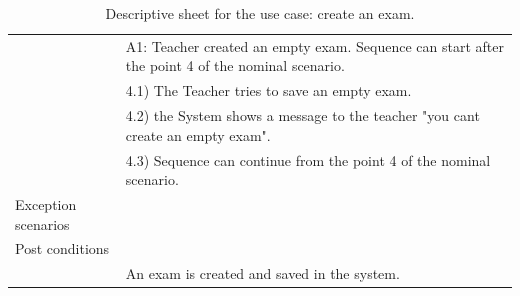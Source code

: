 \documentclass[]{uc2pfecaneva}
\begin{document}
\begin{table}[h]
\begin{tabularx}{\textwidth}{|l|X|}
            & A1: Teacher created an empty exam. Sequence can start after the point 4 of the nominal scenario.            \\
            & \hspace{4mm}4.1) The Teacher tries to save an empty exam.                                                    \\
            & \hspace{4mm}4.2) the System shows a message to the teacher "you cant create an empty exam".                  \\
            & \hspace{4mm}4.3) Sequence can continue from the point 4 of the nominal scenario.                             \\ \hline
            Exception scenarios   &                                                                                                             \\ \hline
            Post conditions       &                                                                                                             \\
            & An exam is created and saved in the system.                                                                 \\ \hline
        \end{tabularx}
        \caption{Descriptive sheet for the use case: create an exam.}
        \label{table:3}
    \end{table}
    \clearpage
\end{document}
